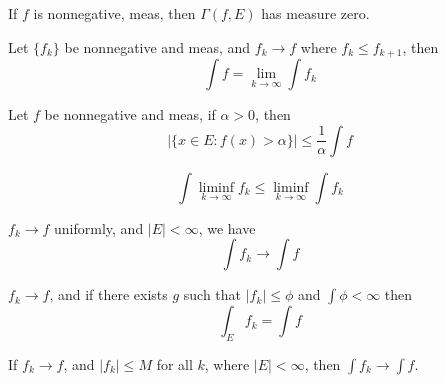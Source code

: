 \documentclass[openany]{book}
\begin{document}
\begin{thm}[Lemma 5.3]
    If $f$ is nonnegative, meas, then $\Gamma(f,E)$ has measure zero.
\end{thm}


\begin{thm}[5.6 MCT]
    Let $\{f_k\}$ be nonnegative and meas, and $f_k\to f$ where $f_k\leq f_{k+1}$, then 
    \begin{equation*}
        \int f=\lim_{k\to\infty}\int f_k
    \end{equation*}
\end{thm}


\begin{thm}
    Let $f$ be nonnegative and meas, if $\alpha>0$, then 
    \begin{equation*}
        |\{x\in E: f(x)>\alpha\}|\leq\frac{1}{\alpha}\int f
    \end{equation*}
\end{thm}

\begin{thm}
    \begin{equation*}
        \int\liminf_{k\to\infty}f_k\leq\liminf_{k\to\infty}\int f_k
    \end{equation*}
\end{thm}



\begin{thm}
    $f_k\to f$ uniformly, and $|E|<\infty$, we have 
    \begin{equation*}
        \int f_k\to \int f
    \end{equation*}
\end{thm}
\begin{thm}
    $f_k\to f$, and if there exists $g$ such that $|f_k|\leq\phi$ and $\int\phi<\infty$ then 
    \begin{equation*}
        \int_Ef_k=\int f
    \end{equation*}
\end{thm}




\begin{thm}[5.37]
    If $f_k\to f$, and $|f_k|\leq M$ for all $k$, where $|E|<\infty$, then $\int f_k\to \int f$.
\end{thm}
\end{document}
